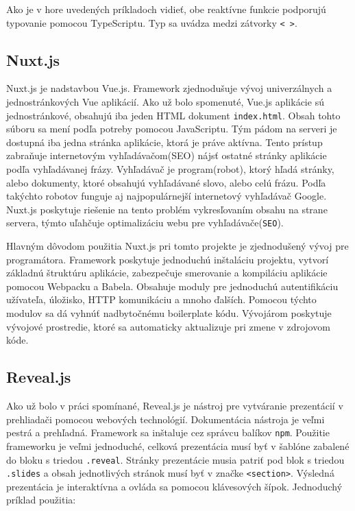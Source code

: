 Ako je v hore uvedených príkladoch vidieť, obe reaktívne funkcie podporujú typovanie pomocou TypeScriptu. Typ sa uvádza medzi zátvorky \texttt{< >}.

\subsection{Nuxt.js}
\label{nuxt}
Nuxt.js je nadstavbou Vue.js. Framework zjednodušuje vývoj univerzálnych a jednostránkových Vue aplikácií. Ako už bolo spomenuté, Vue.js aplikácie sú jednostránkové, obsahujú iba jeden HTML dokument \texttt{index.html}. Obsah tohto súboru sa mení podľa potreby pomocou JavaScriptu. Tým pádom na serveri je dostupná iba jedna stránka aplikácie, ktorá je práve aktívna. Tento prístup zabraňuje internetovým vyhľadávačom(SEO) nájsť ostatné stránky aplikácie podľa vyhľadávanej frázy. Vyhľadávač je program(robot), ktorý hľadá stránky, alebo dokumenty, ktoré obsahujú vyhľadávané slovo, alebo celú frázu. Podľa takýchto robotov funguje aj najpopulárnejší internetový vyhľadávač Google. Nuxt.js poskytuje riešenie na tento problém vykresľovaním obsahu na strane servera, týmto uľahčuje optimalizáciu webu pre vyhľadávače(\texttt{SEO}).

Hlavným dôvodom použitia Nuxt.js pri tomto projekte je zjednodušený vývoj pre programátora. Framework poskytuje jednoduchú inštaláciu projektu, vytvorí základnú štruktúru aplikácie, zabezpečuje smerovanie a kompiláciu aplikácie pomocou Webpacku a Babela. Obsahuje moduly pre jednoduchú autentifikáciu užívateľa, úložisko, HTTP komunikáciu a mnoho ďalších. Pomocou týchto modulov sa dá vyhnúť nadbytočnému boilerplate kódu. Vývojárom poskytuje vývojové prostredie, ktoré sa automaticky aktualizuje pri zmene v zdrojovom kóde.

\subsection{Reveal.js}
\label{reveal}
Ako už bolo v práci spomínané, Reveal.js je nástroj pre vytváranie prezentácií v prehliadači pomocou webových technológií. Dokumentácia nástroja je veľmi pestrá a prehľadná. Framework sa inštaluje cez správcu balíkov \texttt{npm}. Použitie frameworku je veľmi jednoduché, celková prezentácia musí byť v šablóne zabalené do bloku s triedou \texttt{.reveal}. Stránky prezentácie musia patriť pod blok s triedou \texttt{.slides} a obsah jednotlivých stránok musí byť v značke \texttt{<section>}. Výsledná prezentácia je interaktívna a ovláda sa pomocou klávesových šípok. Jednoduchý príklad použitia:

